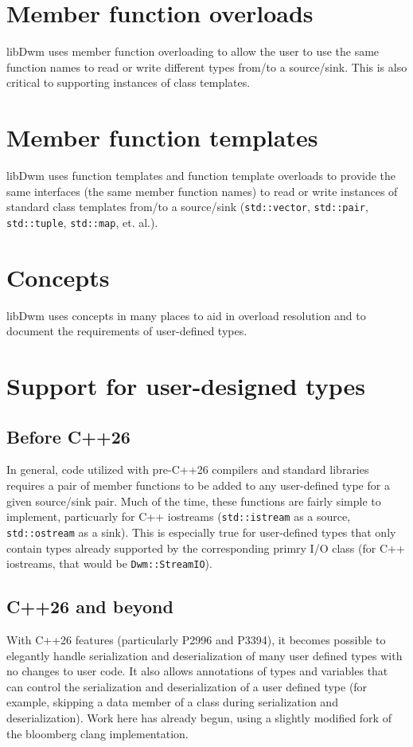 \section{Member function overloads}
libDwm uses member function overloading to allow the user to use the
same function names to read or write different types from/to a
source/sink.  This is also critical to supporting instances of class
templates.

\section{Member function templates}
libDwm uses function templates and function template overloads to
provide the same interfaces (the same member function names) to
read or write instances of standard class templates from/to a
source/sink (\texttt{std::vector}, \texttt{std::pair},
\texttt{std::tuple}, \texttt{std::map}, et. al.).

\section{Concepts}
libDwm uses concepts in many places to aid in overload resolution
and to document the requirements of user-defined types.

\section{Support for user-designed types}
\subsection{Before C++26}
In general, code utilized with pre-C++26 compilers and standard libraries
requires a pair of member functions to be added to any user-defined type
for a given source/sink pair.  Much of the time, these functions are
fairly simple to implement, particuarly for C++ iostreams
(\texttt{std::istream} as a source, \texttt{std::ostream} as a sink).
This is especially true for user-defined types that only contain types
already supported by the corresponding primry I/O class (for C++ iostreams,
that would be \texttt{Dwm::StreamIO}).

\subsection{C++26 and beyond}
With C++26 features (particularly P2996 and P3394), it becomes possible
to elegantly handle serialization and deserialization of many user
defined types with no changes to user code.  It also allows annotations
of types and variables that can control the serialization and
deserialization of a user defined type (for example, skipping a data
member of a class during serialization and deserialization).  Work
here has already begun, using a slightly modified fork of the bloomberg
clang implementation.
